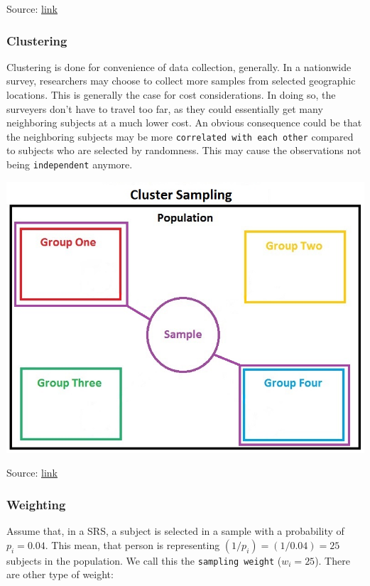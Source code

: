 \documentclass[
]{book}
\begin{document}
Source: \href{https://en.wikipedia.org/wiki/Stratified_sampling}{link}

\hypertarget{clustering}{%
\subsubsection{Clustering}\label{clustering}}

Clustering is done for convenience of data collection, generally. In a nationwide survey, researchers may choose to collect more samples from selected geographic locations. This is generally the case for cost considerations. In doing so, the surveyers don't have to travel too far, as they could essentially get many neighboring subjects at a much lower cost. An obvious consequence could be that the neighboring subjects may be more \texttt{correlated\ with\ each\ other} compared to subjects who are selected by randomness. This may cause the observations not being \texttt{independent} anymore.

\includegraphics[width=0.85\linewidth]{images/ClusterSampling}

Source: \href{https://en.wikipedia.org/wiki/Cluster_sampling}{link}

\hypertarget{weighting}{%
\subsubsection{Weighting}\label{weighting}}

Assume that, in a SRS, a subject is selected in a sample with a probability of \(p_i = 0.04\). This mean, that person is representing \((1/p_i) = (1/0.04) = 25\) subjects in the population. We call this the \texttt{sampling\ weight} (\(w_i = 25\)). There are other type of weight:
\end{document}
